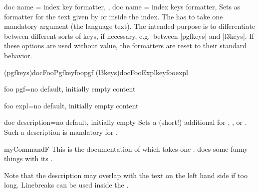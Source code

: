 \begin{docTcbKeys}[
    doc new         = {2023-12-01},
    doc parameter   = \colOpt{=\meta{macro}},
    doc description = {no default, initially empty},
  ]{
    {
      doc name = index key formatter,
    },
    {
      doc name = index keys formatter,
    }
  }
Sets  as formatter for the text given by
 or
 inside the index.
The  has to take one mandatory
argument (the language text).
The intended purpose is to differentiate between different sorts of
keys, if necessary, e.g.\ between |pgfkeys| and |l3keys|.
If these options are used without value, the formatters are reset to
their standard behavior.

\begin{dispExample}
\newcommand{\myFormatPgfkeysIndex}[1]{#1 (\textsf{pgfkeys})}
\newcommand{\myFormatExplkeysIndex}[1]{#1 (\textsf{l3keys})}

\tcbmakedocSubKey[
    index key formatter=\myFormatPgfkeysIndex,
    index keys formatter=\myFormatPgfkeysIndex
  ]{docFooPgfkey}{foopgf}
\tcbmakedocSubKey[
    doc key prefix=,
    index key formatter=\myFormatExplkeysIndex,
    index keys formatter=\myFormatExplkeysIndex
  ]{docFooExplkey}{fooexpl}

\begin{docFooPgfkey}{foo pgf}{=}{no default, initially empty}
  content
\end{docFooPgfkey}

\begin{docFooExplkey}{foo expl}{=}{no default, initially empty}
  content
\end{docFooExplkey}
\end{dispExample}
\end{docTcbKeys}



\clearpage

\begin{docTcbKey}{doc description}{=}{no default, initially empty}
  Sets a (short!) additional  for
  , , or .
  Such a description is
  mandatory for .
\begin{dispExample}
\begin{docCommand*}[doc description=my description]{myCommandF}{}
  This is the documentation of  which takes one .
   does some funny things with its .
\end{docCommand*}
\end{dispExample}
\begin{marker}
Note that the description  may overlap with the text on the left
hand side if too long. Linebreaks can be used inside the .
\end{marker}
\end{docTcbKey}


